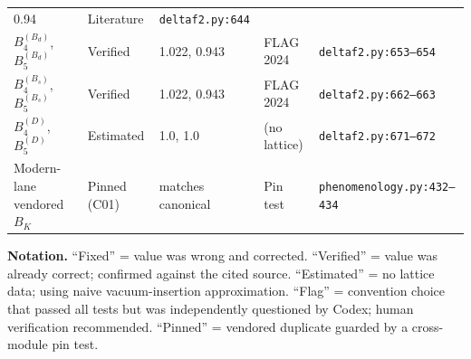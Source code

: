 \documentclass[11pt]{article}
\begin{document}
\begin{longtable}{@{}p{2.6cm}p{2cm}p{2.2cm}p{2.2cm}p{3.8cm}@{}}
  0.94 &
  Literature &
  \texttt{deltaf2.py:644} \\
$B_4^{(B_d)}$, $B_5^{(B_d)}$ &
  Verified &
  1.022, 0.943 &
  FLAG 2024 &
  \texttt{deltaf2.py:653--654} \\
$B_4^{(B_s)}$, $B_5^{(B_s)}$ &
  Verified &
  1.022, 0.943 &
  FLAG 2024 &
  \texttt{deltaf2.py:662--663} \\
$B_4^{(D)}$, $B_5^{(D)}$ &
  Estimated &
  1.0, 1.0 &
  (no lattice) &
  \texttt{deltaf2.py:671--672} \\
Modern-lane vendored $B_K$ &
  Pinned (C01) &
  matches canonical &
  Pin test &
  \texttt{phenomenology.py:432--434} \\
\bottomrule
\end{longtable}

\vspace{1em}
\noindent
\textbf{Notation.}  ``Fixed'' = value was wrong and corrected.
``Verified'' = value was already correct; confirmed against the cited
source.  ``Estimated'' = no lattice data; using naive vacuum-insertion
approximation.  ``Flag'' = convention choice that passed all tests but
was independently questioned by Codex; human verification recommended.
``Pinned'' = vendored duplicate guarded by a cross-module pin test.
\end{document}
